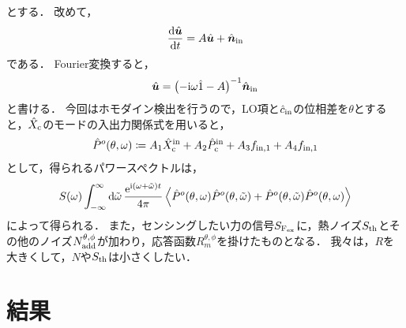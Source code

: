 \documentclass{report}
\begin{document}
    とする．
    改めて，
    \begin{align}
      \dv{\hat{\bm{u}}}{t} = A\hat{\bm{u}} + \hat{\bm{n}}_{\mathrm{in}}
    \end{align}
    である．
    Fourier変換すると，
    \begin{align}
      \hat{\bm{u}} = \qty(-\mathrm{i}\omega\hat{1} - A)^{-1}\hat{\bm{n}}_{\mathrm{in}}
    \end{align}
    と書ける．
    今回はホモダイン検出を行うので，LO項と$\hat{c}_{\mathrm{in}}$の位相差を$\theta$とすると，$\hat{X}_{\mathrm{c}}$のモードの入出力関係式を用いると，
    \begin{align}
      \hat{P}^o(\theta, \omega)\coloneqq A_1\hat{X}^{\mathrm{in}}_{\mathrm{c}} + A_2\hat{P}^{\mathrm{in}}_{\mathrm{c}} + A_3f_{\mathrm{in, 1}} + A_4f_{\mathrm{in, 1}}
    \end{align}
    として，得られるパワースペクトルは，
    \begin{align}
      S(\omega) \int_{-\infty}^{\infty}\dd{\tilde{\omega}}\frac{\e^{\i\qty(\omega + \tilde{\omega})t}}{4\pi}\ev{\hat{P}^o(\theta, \omega)\hat{P}^o(\theta, \tilde{\omega}) + \hat{P}^o(\theta, \tilde{\omega})\hat{P}^o(\theta, \omega)}
    \end{align}
    によって得られる．
    また，センシングしたい力の信号$S_{\mathrm{F_{ex}}}$に，熱ノイズ$S_{\mathrm{th}}$とその他のノイズ$N^{\theta, \phi}_{\mathrm{add}}$が加わり，応答函数$R^{\theta, \phi}_m$を掛けたものとなる．
    我々は，$R$を大きくして，$N$や$S_{\mathrm{th}}$は小さくしたい．
    \section{結果}
      
  \appendix
\end{document}
